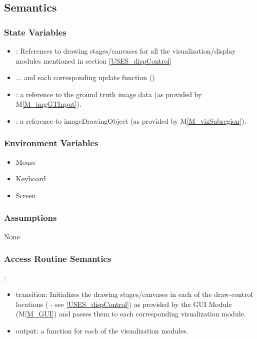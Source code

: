 \documentclass[12pt, titlepage]{article}
\newcommand{\mref}[1]{M\ref{#1}}
\newcommand{\mrefp}[1]{(\mref{#1})}
\newcommand{\mreff}[1]{Module \mrefp{#1}}
\begin{document}
\subsection{Semantics}

\subsubsection{State Variables}
\begin{itemize}
  \item {}: References to drawing stages/canvases for all the visualization/display modules mentioned
    in section \ref{USES_dispControl}
  \item ... and each corresponding update function () 
  \item {}: a reference to the ground truth image data (as provided by \mref{M_imgGTInput}).
  \item {}: a reference to imageDrawingObject (as provided by \mref{M_vizSubregion}).
\end{itemize}

\subsubsection{Environment Variables}
\begin{itemize}
  \item Mouse
  \item Keyboard
  \item Screen
\end{itemize}

\subsubsection{Assumptions}
None

\subsubsection{Access Routine Semantics}

\noindent {}:
\begin{itemize}
\item transition: Initializes the drawing stages/canvases in each of the
  draw-control locations ( - see \ref{USES_dispControl})
  as provided by the GUI \mreff{M_GUI} and passes them to each corresponding visualization module.
\item output: a  function for each of the visualization modules.
\end{itemize}
\end{document}
